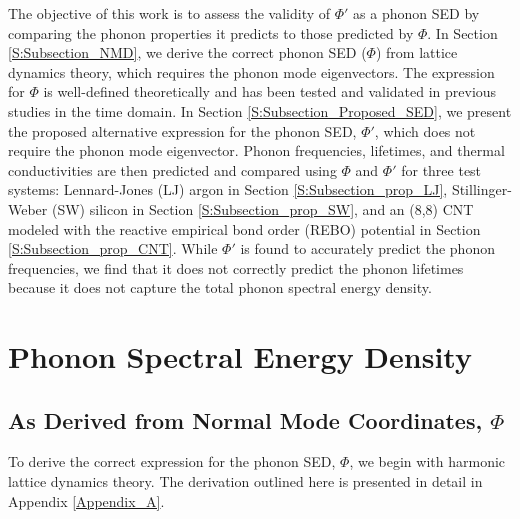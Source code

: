 \documentclass[aps,prb,preprint,superscriptaddress,amsmath,amssymb,floatfix]{revtex4}
\begin{document}
The objective of this work is to assess the validity of $\Phi'$ as a phonon SED by comparing the phonon properties it predicts to those predicted by $\Phi$. In Section \ref{S:Subsection_NMD}, we derive the correct phonon SED ($\Phi$) from lattice dynamics theory, which requires the phonon mode eigenvectors. The expression for $\Phi$ is well-defined theoretically and has been tested and validated in previous studies in the time domain.\cite{ladd1986,turney2009a} In Section \ref{S:Subsection_Proposed_SED}, we present the proposed alternative expression for the phonon SED, $\Phi'$, which does not require the phonon mode eigenvector.\cite{thomas2010c} Phonon frequencies, lifetimes, and thermal conductivities are then predicted and compared using $\Phi$ and $\Phi'$ for three test systems: Lennard-Jones (LJ) argon\cite{ashcroft1976} in Section \ref{S:Subsection_prop_LJ}, Stillinger-Weber (SW) silicon\cite{stillinger1985} in Section \ref{S:Subsection_prop_SW}, and an (8,8) CNT modeled with the reactive empirical bond order (REBO) potential\cite{brenner2002} in Section \ref{S:Subsection_prop_CNT}. While $\Phi'$ is found to accurately predict the phonon frequencies, we find that it does not correctly predict the phonon lifetimes because it does not capture the total phonon spectral energy density.

\section{\label{S:Section_NMD}Phonon Spectral Energy Density}

\subsection{\label{S:Subsection_NMD}As Derived from Normal Mode Coordinates, $\Phi$}

To derive the correct expression for the phonon SED, $\Phi$, we begin with harmonic lattice dynamics theory.\cite{wallace1972,dove1993} The derivation outlined here is presented in detail in Appendix \ref{Appendix_A}.
\end{document}
